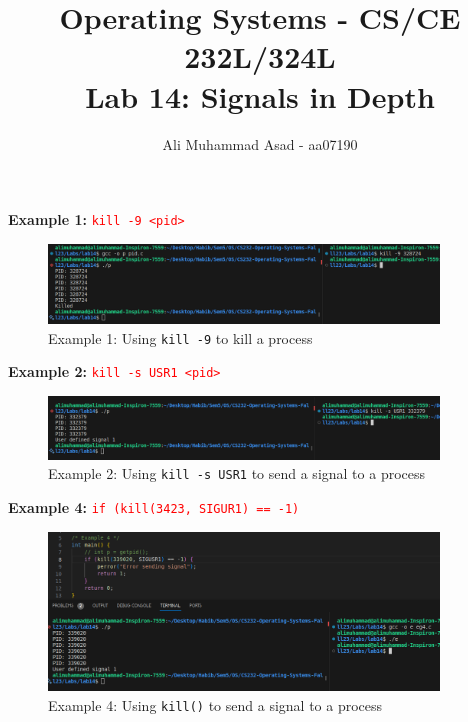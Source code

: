 \documentclass[addpoints]{exam}
\title{Operating Systems - CS/CE 232L/324L\\ Lab 14: Signals in Depth}
\author{Ali Muhammad Asad - aa07190}
\date{} %
\begin{document}
\maketitle


\vspace*{5mm}
\begin{questions}
    \question
    \textbf{Example 1:} \texttt{\textcolor{red}{kill -9 <pid>}}
    \begin{figure}[htbp]
        \centering
        \includegraphics[width=0.925\textwidth]{eg1.png}
        \caption*{Example 1: Using \texttt{kill -9} to kill a process}
    \end{figure}
    
    \question
    \textbf{Example 2:} \texttt{\textcolor{red}{kill -s USR1 <pid>}}
    \begin{figure}[htbp]
        \centering
        \includegraphics[width=0.925\textwidth]{eg2.png}
        \caption*{Example 2: Using \texttt{kill -s USR1} to send a signal to a process}
    \end{figure}
    
    \pagebreak
    \question
    \textbf{Example 4:} \texttt{\textcolor{red}{if (kill(3423, SIGUR1) == -1)}}
    \begin{figure}[htbp]
        \centering
        \includegraphics[width=0.925\textwidth]{eg4.png}
        \caption*{Example 4: Using \texttt{kill()} to send a signal to a process}
    \end{figure}
    

\end{questions}
\end{document}

